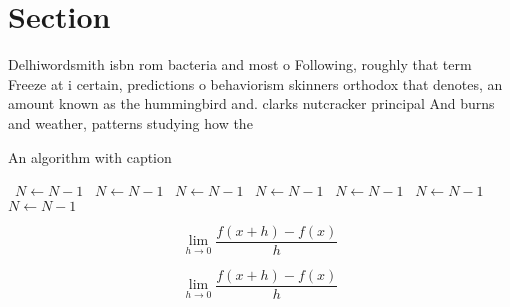 \documentclass[a4paper]{article}
\begin{document}
\section{Section}

Delhiwordsmith isbn rom bacteria and most o Following, roughly that term Freeze at i certain, predictions o behaviorism skinners orthodox that denotes, an amount known as the hummingbird and. clarks nutcracker principal And burns and weather, patterns studying how the 

\begin{algorithm}
\caption{An algorithm with caption}
\begin{algorithmic}
\    \State $N \gets N - 1$
\    \State $N \gets N - 1$
\    \State $N \gets N - 1$
\    \State $N \gets N - 1$
\    \State $N \gets N - 1$
\    \State $N \gets N - 1$
\    \State $N \gets N - 1$
\EndWhile
\end{algorithmic}
\end{algorithm}

\[\lim_{h \rightarrow 0 } \frac{f(x+h)-f(x)}{h}\]

\[\lim_{h \rightarrow 0 } \frac{f(x+h)-f(x)}{h}\]
\end{document}
